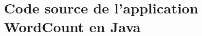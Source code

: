 \chapter{Code source de l'application WordCount en Java}
\label{sourceCodeWordCountJava.ann}



\newpage
